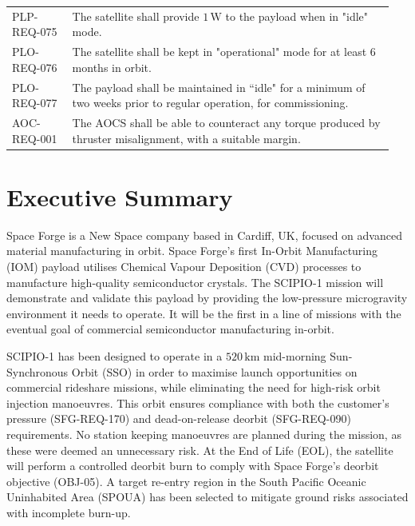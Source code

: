 \documentclass[a4paper, 11pt, conference]{IEEEtran}
\begin{document}
\begin{table}[H]
\begin{tabular}{@{}p{0.15\linewidth}p{0.80\linewidth}@{}}
PLP-REQ-075 & The satellite shall provide $1\,\mathrm{W}$ to the payload when in "idle" mode. \\
PLO-REQ-076 & The satellite shall be kept in "operational" mode for at least 6 months in orbit. \\
PLO-REQ-077 & The payload shall be maintained in ``idle" for a minimum of two weeks prior to regular operation, for commissioning. \\
AOC-REQ-001 & The AOCS shall be able to counteract any torque produced by thruster misalignment, with a suitable margin. \\
\bottomrule
\end{tabular}
\end{table}

\normalsize
\clearpage
{}





\clearpage
{}


\section{Executive Summary}

Space Forge is a New Space \cite{rementeria_power_2022} company based in Cardiff, UK, focused on advanced material manufacturing in orbit. Space Forge’s first In-Orbit Manufacturing (IOM)\label{nom:iom} payload utilises Chemical Vapour Deposition (CVD)\label{nom:cvd} processes to manufacture high-quality semiconductor crystals. The SCIPIO-1 mission will demonstrate and validate this payload by providing the low-pressure microgravity environment it needs to operate. It will be the first in a line of missions with the eventual goal of commercial semiconductor manufacturing in-orbit.

SCIPIO-1 has been designed to operate in a $520\,\mathrm{km}$ mid-morning Sun-Synchronous Orbit (SSO)\label{nom:sso} in order to maximise launch opportunities on commercial rideshare missions, while eliminating the need for high-risk orbit injection manoeuvres. This orbit ensures compliance with both the customer's pressure (SFG-REQ-170) and dead-on-release deorbit (SFG-REQ-090) requirements. No station keeping manoeuvres are planned during the mission, as these were deemed an unnecessary risk. At the End of Life (EOL)\label{nom:eol}, the satellite will perform a controlled deorbit burn to comply with Space Forge's deorbit objective (OBJ-05). A target re-entry region in the South Pacific Oceanic Uninhabited Area (SPOUA)\label{nom:spoua} has been selected to mitigate ground risks associated with incomplete burn-up.
\end{document}
